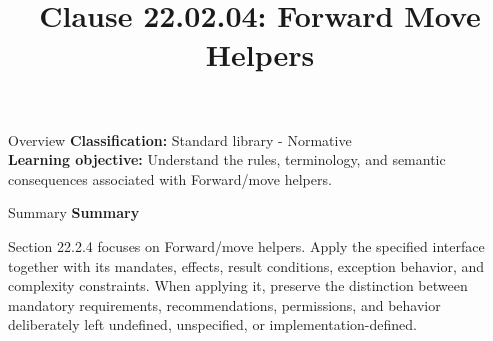 \documentclass[10pt,letterpaper]{article}
\title{Clause 22.02.04: Forward Move Helpers}
\author{}
\date{}
\begin{document}
\maketitle
\begin{CornellOverviewBox}{Overview}
\textbf{Classification:} Standard library - Normative\\[2pt]
\textbf{Learning objective:} Understand the rules, terminology, and semantic consequences associated with Forward/move helpers.
\end{CornellOverviewBox}\begin{CornellSummaryBox}{Summary}
{\sffamily\bfseries\color{Accent} Summary}\par\vspace{3pt}Section 22.2.4 focuses on Forward/move helpers. Apply the specified interface together with its mandates, effects, result conditions, exception behavior, and complexity constraints. When applying it, preserve the distinction between mandatory requirements, recommendations, permissions, and behavior deliberately left undefined, unspecified, or implementation-defined.
\end{CornellSummaryBox}
\end{document}
